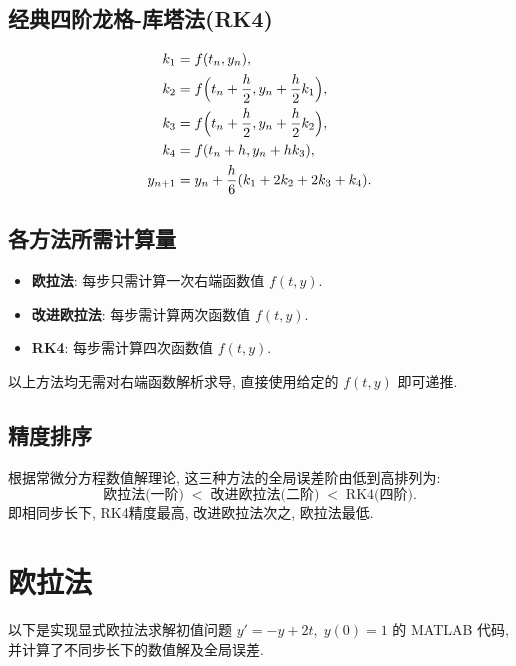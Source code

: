 \documentclass[12pt,a4paper]{ctexart}
\begin{document}
\subsection*{经典四阶龙格-库塔法(RK4)}
\begin{align}
    k_1 &= f(t_n, y_n), \notag \\
    k_2 &= f\Bigl(t_n + \frac{h}{2}, y_n + \frac{h}{2} k_1\Bigr), \notag \\
    k_3 &= f\Bigl(t_n + \frac{h}{2}, y_n + \frac{h}{2} k_2\Bigr), \notag \\
    k_4 &= f(t_n + h, y_n + h k_3), \notag \\
    y_{n+1} &= y_n + \frac{h}{6} (k_1 + 2k_2 + 2k_3 + k_4).
    \label{eq:rk4}
\end{align}

\subsection*{各方法所需计算量}
\begin{itemize}
    \item \textbf{欧拉法}: 每步只需计算一次右端函数值 $f(t, y)$. 
    \item \textbf{改进欧拉法}: 每步需计算两次函数值 $f(t, y)$. 
    \item \textbf{RK4}: 每步需计算四次函数值 $f(t, y)$. 
\end{itemize}
以上方法均无需对右端函数解析求导, 直接使用给定的 $f(t, y)$ 即可递推. 

\subsection*{精度排序}
根据常微分方程数值解理论, 这三种方法的全局误差阶由低到高排列为: 
\[
    \text{欧拉法(一阶)} \;<\; \text{改进欧拉法(二阶)} \;<\; \text{RK4(四阶)}.
\]
即相同步长下, RK4精度最高, 改进欧拉法次之, 欧拉法最低. 

\section{欧拉法}
以下是实现显式欧拉法求解初值问题 $y' = -y + 2t,\; y(0)=1$ 的 MATLAB 代码, 并计算了不同步长下的数值解及全局误差. 
\end{document}
